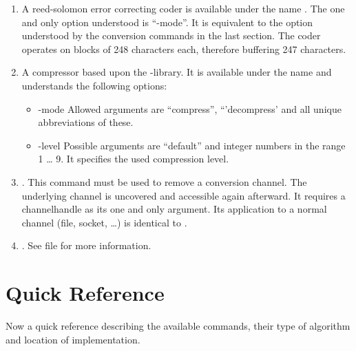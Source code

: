 \documentclass {report}
\begin{document}
\begin	{enumerate}
\item	A reed-solomon error correcting coder is available under the
	name . The one and only option understood is
	``-mode''. It is equivalent to the option understood by the
	conversion commands in the last section. The coder operates on
	blocks of 248 characters each, therefore buffering 247
	characters.

\item	A compressor based upon the \zlib{}-library. It is
	available under the name  and understands the
	following options:

	\begin	{itemize}
	\item[-mode]	Allowed arguments are ``compress'',
			``'decompress' and all unique abbreviations of
			these.
	\item[-level]	Possible arguments are ``default'' and integer
			numbers in the range 1 \dots{} 9. It specifies
			the used compression level.
	\end	{itemize}

\item	{}. This command must be used to remove a
	conversion channel. The underlying channel is uncovered and
	accessible again afterward. It requires a channelhandle as its
	one and only argument. Its application to a normal channel
	(file, socket, \dots {}) is identical to .

\item	{}. See file 
	for more information.
\end	{enumerate}


\section {Quick Reference}
Now a quick reference describing the available commands, their type of
algorithm and location of implementation.
\end{document}

